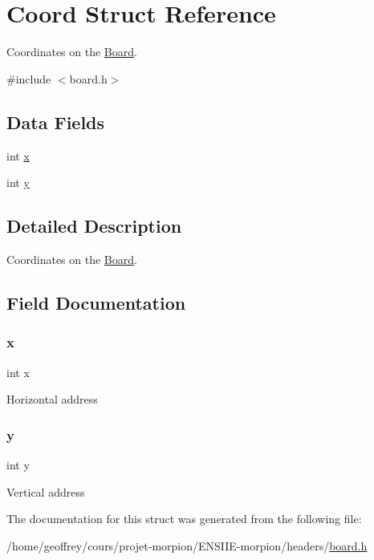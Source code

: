 \hypertarget{struct_coord}{}\section{Coord Struct Reference}
\label{struct_coord}


Coordinates on the \hyperlink{struct_board}{Board}.  




{\ttfamily \#include $<$board.\+h$>$}

\subsection*{Data Fields}
\begin{DoxyCompactItemize}
\item 
int \hyperlink{struct_coord_a6150e0515f7202e2fb518f7206ed97dc}{x}
\item 
int \hyperlink{struct_coord_a0a2f84ed7838f07779ae24c5a9086d33}{y}
\end{DoxyCompactItemize}


\subsection{Detailed Description}
Coordinates on the \hyperlink{struct_board}{Board}. 

\subsection{Field Documentation}
\mbox{\label{struct_coord_a6150e0515f7202e2fb518f7206ed97dc}} 
\subsubsection{\texorpdfstring{x}{x}}
{\footnotesize\ttfamily int x}

Horizontal address \mbox{\label{struct_coord_a0a2f84ed7838f07779ae24c5a9086d33}} 
\subsubsection{\texorpdfstring{y}{y}}
{\footnotesize\ttfamily int y}

Vertical address 

The documentation for this struct was generated from the following file\+:\begin{DoxyCompactItemize}
\item 
/home/geoffrey/cours/projet-\/morpion/\+E\+N\+S\+I\+I\+E-\/morpion/headers/\hyperlink{board_8h}{board.\+h}\end{DoxyCompactItemize}
